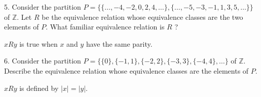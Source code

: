 \documentclass{article}
\begin{document}
\begin{exercise}{}{}
	{5. Consider the partition $P=\{\{\ldots,-4,-2,0,2,4,
			\ldots\},\{\ldots,-5,-3,-1,1,3,5, \ldots\}\}$ of $\mathbb{Z}$. Let $R$ be
		the equivalence relation whose equivalence classes are the two elements of $P$.
		What familiar equivalence relation is $R$ ?}
	\begin{alist}
		\item $xRy$ is true when $x$ and $y$ have the same parity.
	\end{alist}
\end{exercise}{}{}

\begin{exercise}{}{}
	{6. Consider the partition
		$P=\{\{0\},\{-1,1\},\{-2,2\},\{-3,3\},\{-4,4\}, \ldots\}$ of $\mathbb{Z}$.
		Describe the equivalence relation whose equivalence classes are the elements of
		$P$.}
	\begin{alist}
		\item $xRy$ is defined by $|x|=|y|$.
	\end{alist}
\end{exercise}{}{}
\end{document}
